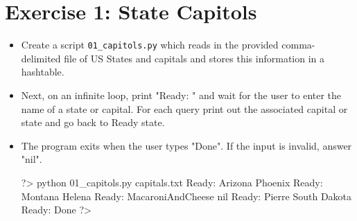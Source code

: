 \documentclass{42-en}
\begin{document}
\nextexercice
\newpage


\chapter{Exercise 1: State Capitols}
\makeheaderfiles

\begin{itemize}

\item Create a script \texttt{01\_capitols.py} which reads in the provided comma-delimited file of US States and capitals and stores this information in a hashtable.
\item Next, on an infinite loop, print "Ready: " and wait for the user to enter the name of a state or capital. For each query print out the associated capital or state and go back to Ready state.
\item The program exits when the user types "Done". If the input is invalid, answer "nil".

\begin{42console}
	?> python 01_capitols.py capitals.txt
	Ready: Arizona
	Phoenix
	Ready: Montana
	Helena
	Ready: MacaroniAndCheese
	nil
	Ready: Pierre
	South Dakota
	Ready: Done
	?>
\end{42console}

\end{itemize}

\nextexercice
\newpage

\end{document}
